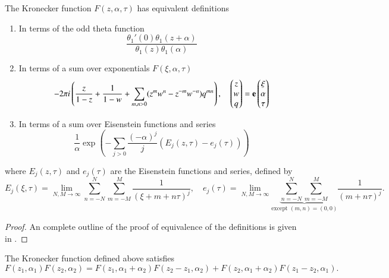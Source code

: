 \begin{definition}
    The Kronecker function $F(z,\alpha,\tau)$ has equivalent definitions \cite{BL13}
    \begin{enumerate}
        \item In terms of the odd theta function
        \[\frac{\theta_1'(0)\theta_1(z+\alpha)}{\theta_1(z)\theta_1(\alpha)}\]
        \item In terms of a sum over exponentials $F(\xi,\alpha,\tau)$
        \[-2\pi i \left(\frac{z}{1-z} + \frac{1}{1-w} + \sum_{m,n > 0} (z^m w^n - z^{-m} w^{-n}) q^{mn}\right) , \quad \begin{pmatrix} z \\ w \\ q \end{pmatrix} = \mathbf{e} \begin{pmatrix}\xi \\ \alpha \\ \tau\end{pmatrix}\]
        \item In terms of a sum over Eisenstein functions and series
        \[\frac{1}{\alpha} \exp\left(-\sum_{j > 0} \frac{(-\alpha)^j}{j} (E_j(z,\tau) - e_j(\tau))\right)\]
    \end{enumerate}
    where $E_j(z,\tau)$ and $e_j(\tau)$ are the Eisenstein functions and series, defined by
    \begin{equation}
        E_j(\xi,\tau) = \lim_{N,M\rightarrow \infty} \sum_{n=-N}^N \sum_{m=-M}^M \frac{1}{(\xi+m+n\tau)^j}, \quad e_j(\tau) = \lim_{N,M\rightarrow \infty} \underset{\text{except }(m,n)=(0,0)}{\underbrace{\sum_{n=-N}^N \sum_{m=-M}^M}} \frac{1}{(m+n\tau)^j}.
    \end{equation}
\end{definition}

\begin{proof}
    An complete outline of the proof of equivalence of the definitions is given in \cite{BL13}.
\end{proof}

\begin{lemma}
    The Kronecker function defined above satisfies
    \begin{equation}
        {F}(z_1,\alpha_1){F}(z_2,\alpha_2) = {F}(z_1,\alpha_1+\alpha_2){F}(z_2-z_1,\alpha_2) + {F}(z_2,\alpha_1+\alpha_2){F}(z_1-z_2,\alpha_1).
    \end{equation}
\end{lemma}

